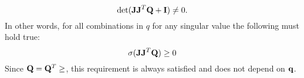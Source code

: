 %
\begin{equation}
\det({\bf JJ}^T{\bf Q} + {\bf I}) \neq 0.
\end{equation}
%
In other words, for all combinations in $q$ for any singular value the following must hold true:
%
\begin{equation}
\sigma({\bf JJ}^T{\bf Q})\geq0
\end{equation}
%
Since ${\bf Q} = {\mathbf Q}^T \geq$, this requirement is always satisfied and does not depend on ${\bf q}$.